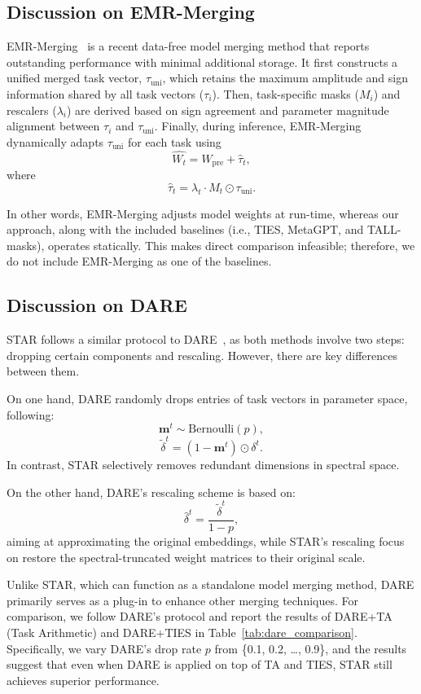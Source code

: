 \subsection{Discussion on EMR-Merging}\label{discuss_EMR_Merging}
EMR-Merging~\cite{huang2024emr} is a recent data-free model merging method that reports outstanding performance with minimal additional storage. It first constructs a unified merged task vector, \( \tau_{\text{uni}} \), which retains the maximum amplitude and sign information shared by all task vectors (\( \tau_i \)). Then, task-specific masks (\( M_i \)) and rescalers (\( \lambda_i \)) are derived based on sign agreement and parameter magnitude alignment between \( \tau_i \) and \( \tau_{\text{uni}} \). Finally, during inference, EMR-Merging dynamically adapts \( \tau_{\text{uni}} \) for each task using 
\[
\hat{W_t} = W_{\text{pre}} + \hat{\tau}_t,
\]
where 
\[
\hat{\tau}_t = \lambda_t \cdot M_t \odot \tau_{\text{uni}}.
\]

In other words, EMR-Merging adjusts model weights at run-time, whereas our approach, along with the included baselines (i.e., TIES, MetaGPT, and TALL-masks), operates statically. This makes direct comparison infeasible; therefore, we do not include EMR-Merging as one of the baselines.

\subsection{Discussion on DARE}\label{discuss_DARE}

STAR follows a similar protocol to DARE~\cite{yu2024language}, as both methods involve two steps: dropping certain components and rescaling. However, there are key differences between them.

On one hand, DARE randomly drops entries of task vectors in parameter space, following:
\[
\mathbf{m}^t \sim \text{Bernoulli}(p),
\]
\[
\tilde{\delta}^t = (1 - \mathbf{m}^t) \odot \delta^t.
\]
In contrast, STAR selectively removes redundant dimensions in spectral space.

On the other hand, DARE's rescaling scheme is based on:
\[
\hat{\delta}^t = \frac{\tilde{\delta}^t}{1 - p},
\]
aiming at approximating the original embeddings, while STAR's rescaling focus on restore the spectral-truncated weight matrices to their original scale.

Unlike STAR, which can function as a standalone model merging method, DARE primarily serves as a plug-in to enhance other merging techniques. For comparison, we follow DARE's protocol and report the results of DARE+TA (Task Arithmetic) and DARE+TIES in Table~\ref{tab:dare_comparison}. Specifically, we vary DARE's drop rate \( p \) from \{0.1, 0.2, \dots, 0.9\}, and the results suggest that even when DARE is applied on top of TA and TIES, STAR still achieves superior performance.


